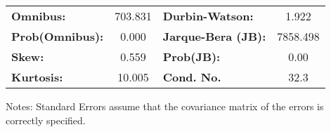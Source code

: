 \begin{center}
\begin{tabular}{lcccccc}
\bottomrule
\end{tabular}
\begin{tabular}{lclc}
\textbf{Omnibus:}       & 703.831 & \textbf{  Durbin-Watson:     } &    1.922  \\
\textbf{Prob(Omnibus):} &   0.000 & \textbf{  Jarque-Bera (JB):  } & 7858.498  \\
\textbf{Skew:}          &   0.559 & \textbf{  Prob(JB):          } &     0.00  \\
\textbf{Kurtosis:}      &  10.005 & \textbf{  Cond. No.          } &     32.3  \\
\bottomrule
\end{tabular}
\end{center}

Notes: \newline
 [1] Standard Errors assume that the covariance matrix of the errors is correctly specified.